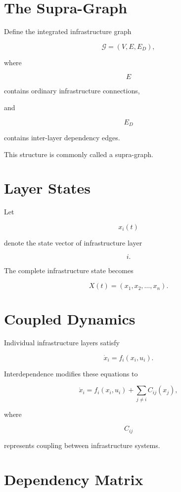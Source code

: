 \documentclass[11pt,fleqn]{book}
\numberwithin{equation}{chapter}
\theoremstyle{plain}
\theoremstyle{definition}
\theoremstyle{remark}
\begin{document}
\section{The Supra-Graph}

Define the integrated infrastructure graph

\[
\boxed{
\mathcal G
=
(V,E,E_D),
}
\]

where

\[
E
\]

contains ordinary infrastructure connections,

and

\[
E_D
\]

contains inter-layer dependency edges.

This structure is commonly called a supra-graph.


\section{Layer States}

Let

\[
x_i(t)
\]

denote the state vector of infrastructure layer

\[
i.
\]

The complete infrastructure state becomes

\[
\boxed{
X(t)
=
(x_1,x_2,\ldots,x_n).
}
\]


\section{Coupled Dynamics}

Individual infrastructure layers satisfy

\[
\dot x_i
=
f_i(x_i,u_i).
\]

Interdependence modifies these equations to

\[
\boxed{
\dot x_i
=
f_i
(x_i,u_i)
+
\sum_{j\neq i}
C_{ij}(x_j),
}
\]

where

\[
C_{ij}
\]

represents coupling between infrastructure systems.


\section{Dependency Matrix}
\end{document}
